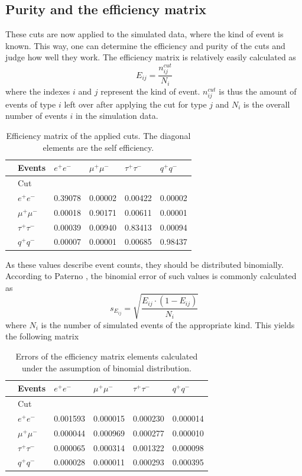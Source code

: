 \newpage
\subsection{Purity and the efficiency matrix}
These cuts are now applied to the simulated data, where the kind of event is known. This way, one can determine the efficiency and purity of the cuts and judge how well they work. 
The efficiency matrix is relatively easily calculated as
\begin{equation}
E_{ij}=\frac{n^{cut}_{ij}}{N_i}
\end{equation}
where the indexes $i$ and $j$ represent the kind of event. $n_{ij}^{cut}$ is thus the amount of events of type $i$ left over after applying the cut for type $j$ and $N_i$ is the overall number of events $i$ in the simulation data.
\begin{table}[H]\centering
	\begin{tabular}{@{}llllll@{}}
		\toprule
		&Events &$e^+e^-$&$\mu^+\mu^-$&$\tau^+\tau^-$&$q^+q^-$\\
		\midrule
		&Cut&&&&\\
		&$e^+e^-$&0.39078&0.00002&0.00422&0.00002\\
		&$\mu^+\mu^-$&0.00018&0.90171&0.00611&0.00001\\
		&$\tau^+\tau^-$&0.00039&0.00940&0.83413&0.00094\\
		&$q^+q^-$&0.00007&0.00001&0.00685&0.98437\\
	\end{tabular}
	\caption[Efficiency matrix]{Efficiency matrix of the applied cuts. The diagonal elements are the self efficiency.}
	\label{tb:efficiency}
\end{table}

As these values describe event counts, they should be distributed binomially. According to Paterno \cite{binpaper}, the binomial error of such values is commonly calculated as
\begin{equation}
s_{E_{ij}}=\sqrt{\frac{E_{ij}\cdot(1-E_{ij})}{N_i}}
\end{equation}
where $N_i$ is the number of simulated events of the appropriate kind. This yields the following matrix

\begin{table}[H]\centering
	\begin{tabular}{@{}llllll@{}}
		\toprule
		&Events &$e^+e^-$&$\mu^+\mu^-$&$\tau^+\tau^-$&$q^+q^-$\\
		\midrule
		&Cut&&&&\\
		&$e^+e^-$&0.001593&0.000015&0.000230&0.000014\\
		&$\mu^+\mu^-$&0.000044&0.000969&0.000277&0.000010\\
		&$\tau^+\tau^-$&0.000065&0.000314&0.001322&0.000098\\
		&$q^+q^-$&0.000028&0.000011&0.000293&0.000395\\
		\bottomrule
	\end{tabular}
	\caption[Efficiency error matrix]{Errors of the efficiency matrix elements calculated under the assumption of binomial distribution.}
	\label{tb:efficiencyerr}
\end{table}

